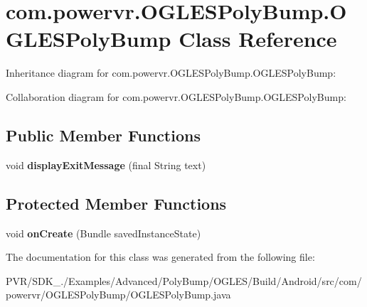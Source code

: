 \hypertarget{classcom_1_1powervr_1_1_o_g_l_e_s_poly_bump_1_1_o_g_l_e_s_poly_bump}{\section{com.\+powervr.\+O\+G\+L\+E\+S\+Poly\+Bump.\+O\+G\+L\+E\+S\+Poly\+Bump Class Reference}
\label{classcom_1_1powervr_1_1_o_g_l_e_s_poly_bump_1_1_o_g_l_e_s_poly_bump}
}


Inheritance diagram for com.\+powervr.\+O\+G\+L\+E\+S\+Poly\+Bump.\+O\+G\+L\+E\+S\+Poly\+Bump\+:


Collaboration diagram for com.\+powervr.\+O\+G\+L\+E\+S\+Poly\+Bump.\+O\+G\+L\+E\+S\+Poly\+Bump\+:
\subsection*{Public Member Functions}
\begin{DoxyCompactItemize}
\item 
\hypertarget{classcom_1_1powervr_1_1_o_g_l_e_s_poly_bump_1_1_o_g_l_e_s_poly_bump_a9e80cbdd99ab33738fb4f027c11e5082}{void {\bfseries display\+Exit\+Message} (final String text)}\label{classcom_1_1powervr_1_1_o_g_l_e_s_poly_bump_1_1_o_g_l_e_s_poly_bump_a9e80cbdd99ab33738fb4f027c11e5082}

\end{DoxyCompactItemize}
\subsection*{Protected Member Functions}
\begin{DoxyCompactItemize}
\item 
\hypertarget{classcom_1_1powervr_1_1_o_g_l_e_s_poly_bump_1_1_o_g_l_e_s_poly_bump_af2f153de24ba216bfea1a428db45c072}{void {\bfseries on\+Create} (Bundle saved\+Instance\+State)}\label{classcom_1_1powervr_1_1_o_g_l_e_s_poly_bump_1_1_o_g_l_e_s_poly_bump_af2f153de24ba216bfea1a428db45c072}

\end{DoxyCompactItemize}


The documentation for this class was generated from the following file\+:\begin{DoxyCompactItemize}
\item 
P\+V\+R/\+S\+D\+K\+\_./\+Examples/\+Advanced/\+Poly\+Bump/\+O\+G\+L\+E\+S/\+Build/\+Android/src/com/powervr/\+O\+G\+L\+E\+S\+Poly\+Bump/O\+G\+L\+E\+S\+Poly\+Bump.\+java\end{DoxyCompactItemize}
